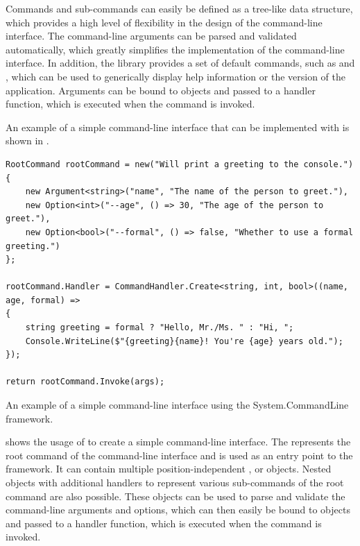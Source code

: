 Commands and sub-commands can easily be defined as a tree-like data structure, which provides a high level of flexibility in the design of the command-line interface. The command-line arguments can be parsed and validated automatically, which greatly simplifies the implementation of the command-line interface. In addition, the library provides a set of default commands, such as  and , which can be used to generically display help information or the version of the application. Arguments can be bound to objects and passed to a handler function, which is executed when the command is invoked.

An example of a simple command-line interface that can be implemented with  is shown in .

\begin{listing}[H]
\begin{verbatim}
RootCommand rootCommand = new("Will print a greeting to the console.")
{
    new Argument<string>("name", "The name of the person to greet."),
    new Option<int>("--age", () => 30, "The age of the person to greet."),
    new Option<bool>("--formal", () => false, "Whether to use a formal greeting.")
};

rootCommand.Handler = CommandHandler.Create<string, int, bool>((name, age, formal) =>
{
    string greeting = formal ? "Hello, Mr./Ms. " : "Hi, ";
    Console.WriteLine($"{greeting}{name}! You're {age} years old.");
});

return rootCommand.Invoke(args);
\end{verbatim}
\caption{An example of a simple command-line interface using the System.CommandLine framework.}
\label{lst:cli-example}
\end{listing}

 shows the usage of  to create a simple command-line interface. The  represents the root command of the command-line interface and is used as an entry point to the framework. It can contain multiple position-independent , or  objects. Nested  objects with additional handlers to represent various sub-commands of the root command are also possible. These objects can be used to parse and validate the command-line arguments and options, which can then easily be bound to objects and passed to a handler function, which is executed when the command is invoked.

